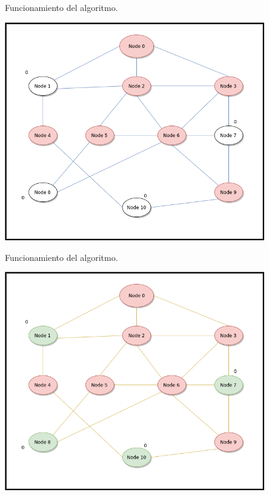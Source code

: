 \documentclass[10pt]{beamer}
\begin{document}
\begin{frame}{Funcionamiento del algoritmo.}{}
	\begin{block}{}
		\includegraphics[width=0.85\textwidth]{gif-8.png}
	\end{block}
\end{frame}
\begin{frame}{Funcionamiento del algoritmo.}{}
	\begin{block}{}
		\includegraphics[width=0.85\textwidth]{gif-9.png}
	\end{block}
\end{frame}
\end{document}
